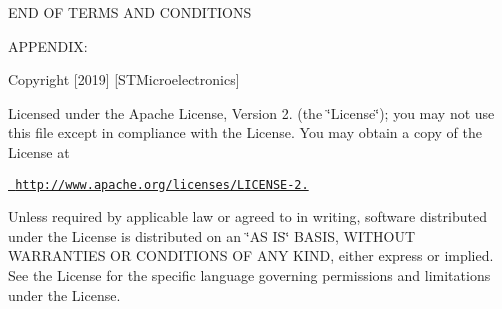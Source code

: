 END OF TERMS AND CONDITIONS

APPENDIX\+:

Copyright \mbox{[}2019\mbox{]} \mbox{[}STMicroelectronics\mbox{]}

Licensed under the Apache License, Version 2. (the \char`\"{}\+License\char`\"{}); you may not use this file except in compliance with the License. You may obtain a copy of the License at

\href{http://www.apache.org/licenses/LICENSE-2.0}{\texttt{ http\+://www.\+apache.\+org/licenses/\+LICENSE-\/2.}}

Unless required by applicable law or agreed to in writing, software distributed under the License is distributed on an \char`\"{}\+AS IS\char`\"{} BASIS, WITHOUT WARRANTIES OR CONDITIONS OF ANY KIND, either express or implied. See the License for the specific language governing permissions and limitations under the License. 